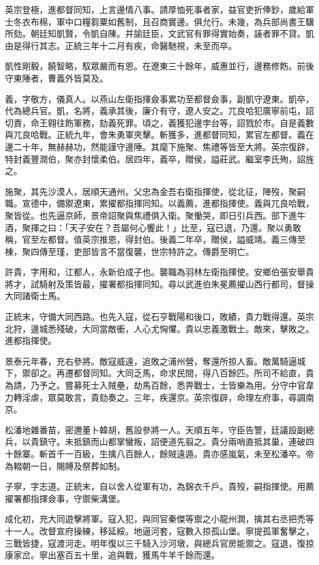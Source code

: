 \begin{pinyinscope}
英宗登極，進都督同知，上言邊情八事。請厚恤死事者家，益官吏折俸鈔，歲給軍士冬衣布棉，軍中口糧芻粟如舊制，且召商實邊。俱允行。未幾，為兵部尚書王驥所劾。朝廷知凱賢，令凱自陳。并諭廷臣，文武官有罪得實始奏，誣者罪不貸。凱由是得行其志。正統三年十二月有疾，命醫馳視，未至而卒。

凱性剛毅，饒智略，馭眾嚴而有恩。在遼東三十餘年，威惠並行，邊務修飭。前後守東陲者，曹義外皆莫及。

義，字敬方，儀真人。以燕山左衛指揮僉事累功至都督僉事，副凱守遼東。凱卒，代為總兵官。凱，名將，義承其後，廉介有守，遼人安之。兀良哈犯廣寧前屯，詔切責，命王翱往飭軍務，劾義死罪。頃之，義獲犯邊孛台等，詔戮於市。自是義數與兀良哈戰。正統九年，會朱勇軍夾擊。斬獲多，進都督同知，累官左都督。義在邊二十年，無赫赫功，然能謹守邊陲。其麾下施聚、焦禮等皆至大將。英宗復辟，特封義豐潤伯，聚亦封懷柔伯。居四年，義卒，贈侯，謚莊武。繼室李氏殉，詔旌之。

施聚，其先沙漠人，居順天通州。父忠為金吾右衛指揮使，從北征，陣歿，聚嗣職。宣德中，備禦遼東，累擢都指揮同知。以義薦，進都指揮使。義與兀良哈戰，聚皆從。也先逼京師，景帝詔聚與焦禮俱入衛。聚慟哭，即日引兵西。部下進牛酒，聚揮之曰：「天子安在？吾屬何心饗此！」比至，寇已退，乃還。聚以勇敢稱，官至左都督。值英宗推恩，得封伯。後義二年卒，贈侯，謚威靖。義三傳至棟，聚四傳至瑾，吏部皆言不當復襲，世宗特許之。傳爵至明亡。

許貴，字用和，江都人，永新伯成子也。襲職為羽林左衛指揮使。安鄉伯張安舉貴將才，試騎射及策皆最，擢署都指揮同知。尋以武進伯朱冕薦擢山西行都司，督操大同諸衛士馬。

正統末，守備大同西路。也先入寇，從石亨戰陽和後口，敗績，貴力戰得還。英宗北狩，邊城悉殘破，大同當敵衝，人心尤恟懼。貴以忠義激戰士。敵來，擊敗之。進都指揮使。

景泰元年春，充右參將。敵寇威遠，追敗之浦州營，奪還所掠人畜。敵萬騎逼城下，禦卻之。再遷都督同知。大同乏馬，命求民間，得八百餘匹。所司不給直，貴為請，乃予之。嘗募死士入賊壘，劫馬百餘，悉畀戰士，士皆樂為用。分守中官韋力轉淫虐，眾莫敢言，貴劾奏之。三年，疾還京。英宗復辟，命理左府事，尋調南京。

松潘地雜番苗，密邇董卜韓胡，舊設參將一人。天順五年，守臣告警，廷議設副總兵，以貴鎮守。未抵鎮而山都掌蠻叛，詔便道先翦之。貴分兩哨直抵其巢，連破四十餘寨。斬首千一百級，生擒八百餘人，餘賊遠遁。貴亦感嵐氣，未至松潘卒。帝為輟朝一日，賜賻及祭葬如制。

子寧，字志道。正統末，自以舍人從軍有功，為錦衣千戶。貴歿，嗣指揮使。用薦擢署都指揮僉事，守禦柴溝堡。

成化初，充大同遊擊將軍。寇入犯，與同官秦傑等禦之小龍州澗，擒其右丞把禿等十一人。改督宣府操練，移延綏。地逼河套，寇數入掠孤山堡。寧提孤軍奮擊之，三戰皆捷，寇渡河走。明年復以三千騎入沙河墩，與總兵官房能禦之。寇退，復掠康家岔。寧出塞百五十里，追與戰，獲馬牛羊千餘而還。


\end{pinyinscope}
